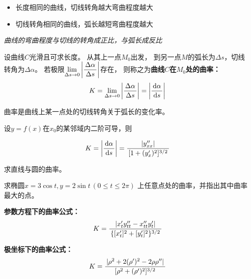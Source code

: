 \begin{itemize}
  \setlength{\itemindent}{1cm}
  \item 长度相同的曲线，切线转角越大弯曲程度越大
  \item 切线转角相同的曲线，弧长越短弯曲程度越大
\end{itemize}

{\it 曲线的弯曲程度与切线的转角成正比，与弧长成反比}

\begin{thx}
	设曲线$C$光滑且可求长度。 从其上一点$M_0$出发，
	到另一点$M$的弧长为$\Delta s$，切线转角为$\Delta\alpha$。
	 若极限$\lim\limits_{\Delta s\to
	0}\left|\displaystyle\frac{\,{\Delta\alpha}\,}{\,{\Delta s}\,}\right|$存在，
	则称之为{\bf 曲线$C$在$M_0$处的曲率：}
	$${K=\lim\limits_{\Delta s\to
	0}\left|\displaystyle\frac{\,{\Delta\alpha}\,}{\,{\Delta s}\,}\right|
	=\left|\displaystyle\frac{\,{\mathrm{d}\alpha}\,}{\,{\mathrm{d} s}\,}\right|}$$ 
\end{thx}

曲率是曲线上某一点处的切线转角关于弧长的变化率。


设$y=f(x)$在$x_0$的某邻域内二阶可导，则
\begin{thx}
	$$K=\left|\displaystyle\frac{\,{\mathrm{d}\alpha}\,}{\,{\mathrm{d} s}\,}\right|
	 =\displaystyle\frac{\,{|y''_{xx}|}\,}{\,{[1+(y'_x)^2]^{3/2}}\,}$$
\end{thx}
 
\egz 求直线与圆的曲率。

\egz 求椭圆$x=3\cos t,y=2\sin t\,(0\leq t\leq 2\pi)$
上任意点处的曲率，并指出其中曲率最大的点。

\begin{center}
\end{center}

\begin{thx}
	{\bf 参数方程下的曲率公式：}
	$${K=\displaystyle\frac{\,{|x'_ty''_{tt}-x''_{tt}y'_t|}\,}{\,{\{[x'_t]^2+[y'_t]^2\}^{3/2}}\,}}$$
	
	{\bf 极坐标下的曲率公式：}
	$$K=\displaystyle\frac{\,{|\rho^2+2(\rho')^2-2\rho\rho''|}\,}{\,{[\rho^2+(\rho')^2]^{3/2}}\,}$$
\end{thx}

